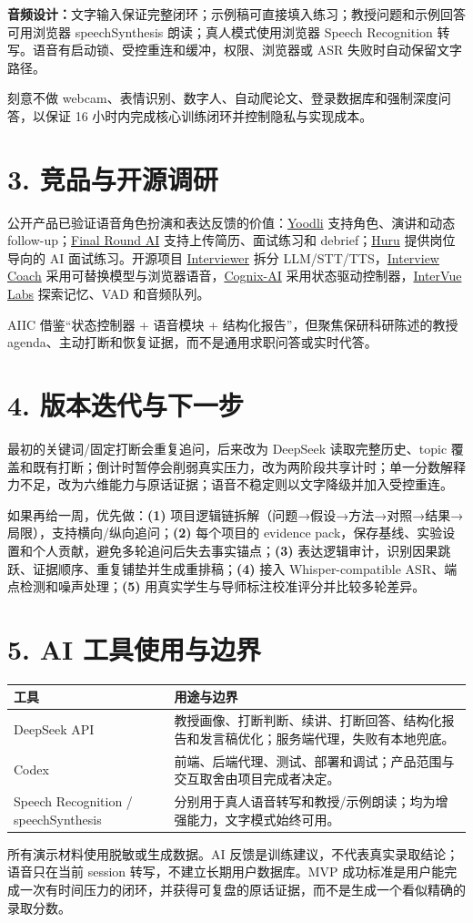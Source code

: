 \documentclass[UTF8,10pt,a4paper]{ctexart}
\begin{document}
\textbf{音频设计：}文字输入保证完整闭环；示例稿可直接填入练习；教授问题和示例回答可用浏览器 speechSynthesis 朗读；真人模式使用浏览器 Speech Recognition 转写。语音有启动锁、受控重连和缓冲，权限、浏览器或 ASR 失败时自动保留文字路径。

刻意不做 webcam、表情识别、数字人、自动爬论文、登录数据库和强制深度问答，以保证 16 小时内完成核心训练闭环并控制隐私与实现成本。

\section*{3. 竞品与开源调研}
公开产品已验证语音角色扮演和表达反馈的价值：\href{https://support.yoodli.ai/en/articles/9550465-practice-with-yoodli}{Yoodli} 支持角色、演讲和动态 follow-up；\href{https://www.finalroundai.com/}{Final Round AI} 支持上传简历、面试练习和 debrief；\href{https://huru.ai/}{Huru} 提供岗位导向的 AI 面试练习。开源项目 \href{https://github.com/IliaLarchenko/Interviewer}{Interviewer} 拆分 LLM/STT/TTS，\href{https://github.com/J3rry320/interview-coach}{Interview Coach} 采用可替换模型与浏览器语音，\href{https://github.com/Priyansh143/Cognix-AI}{Cognix-AI} 采用状态驱动控制器，\href{https://github.com/codexsys-7/ai-interview}{InterVue Labs} 探索记忆、VAD 和音频队列。

AIIC 借鉴“状态控制器 + 语音模块 + 结构化报告”，但聚焦保研科研陈述的教授 agenda、主动打断和恢复证据，而不是通用求职问答或实时代答。

\section*{4. 版本迭代与下一步}
最初的关键词/固定打断会重复追问，后来改为 DeepSeek 读取完整历史、topic 覆盖和既有打断；倒计时暂停会削弱真实压力，改为两阶段共享计时；单一分数解释力不足，改为六维能力与原话证据；语音不稳定则以文字降级并加入受控重连。

如果再给一周，优先做：\textbf{(1)} 项目逻辑链拆解（问题→假设→方法→对照→结果→局限），支持横向/纵向追问；\textbf{(2)} 每个项目的 evidence pack，保存基线、实验设置和个人贡献，避免多轮追问后失去事实锚点；\textbf{(3)} 表达逻辑审计，识别因果跳跃、证据顺序、重复铺垫并生成重排稿；\textbf{(4)} 接入 Whisper-compatible ASR、端点检测和噪声处理；\textbf{(5)} 用真实学生与导师标注校准评分并比较多轮差异。

\section*{5. AI 工具使用与边界}
\begin{tabularx}{\linewidth}{@{}lX@{}}
\toprule
工具 & 用途与边界\\\midrule
DeepSeek API & 教授画像、打断判断、续讲、打断回答、结构化报告和发言稿优化；服务端代理，失败有本地兜底。\\
Codex & 前端、后端代理、测试、部署和调试；产品范围与交互取舍由项目完成者决定。\\
Speech Recognition / speechSynthesis & 分别用于真人语音转写和教授/示例朗读；均为增强能力，文字模式始终可用。\\
\bottomrule
\end{tabularx}

所有演示材料使用脱敏或生成数据。AI 反馈是训练建议，不代表真实录取结论；语音只在当前 session 转写，不建立长期用户数据库。MVP 成功标准是用户能完成一次有时间压力的闭环，并获得可复盘的原话证据，而不是生成一个看似精确的录取分数。
\end{document}
